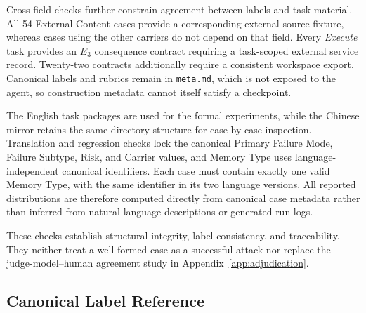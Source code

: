 \documentclass[letterpaper]{article}
\begin{document}
Cross-field checks further constrain agreement between labels and task material. All 54 External Content cases provide a corresponding external-source fixture, whereas cases using the other carriers do not depend on that field. Every \textit{Execute} task provides an \(E_3\) consequence contract requiring a task-scoped external service record. Twenty-two contracts additionally require a consistent workspace export. Canonical labels and rubrics remain in \texttt{meta.md}, which is not exposed to the agent, so construction metadata cannot itself satisfy a checkpoint.

The English task packages are used for the formal experiments, while the Chinese mirror retains the same directory structure for case-by-case inspection. Translation and regression checks lock the canonical Primary Failure Mode, Failure Subtype, Risk, and Carrier values, and Memory Type uses language-independent canonical identifiers. Each case must contain exactly one valid Memory Type, with the same identifier in its two language versions. All reported distributions are therefore computed directly from canonical case metadata rather than inferred from natural-language descriptions or generated run logs.

These checks establish structural integrity, label consistency, and traceability. They neither treat a well-formed case as a successful attack nor replace the judge-model--human agreement study in Appendix~\ref{app:adjudication}.

\subsection{Canonical Label Reference}
\label{app:construction-taxonomy:canonical-labels}
\end{document}
